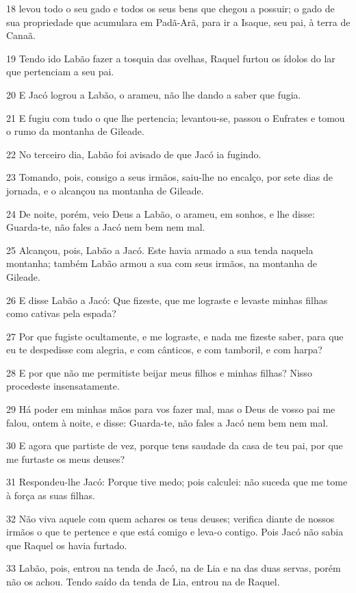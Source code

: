 \par 18 levou todo o seu gado e todos os seus bens que chegou a possuir; o gado de sua propriedade que acumulara em Padã-Arã, para ir a Isaque, seu pai, à terra de Canaã.
\par 19 Tendo ido Labão fazer a tosquia das ovelhas, Raquel furtou os ídolos do lar que pertenciam a seu pai.
\par 20 E Jacó logrou a Labão, o arameu, não lhe dando a saber que fugia.
\par 21 E fugiu com tudo o que lhe pertencia; levantou-se, passou o Eufrates e tomou o rumo da montanha de Gileade.
\par 22 No terceiro dia, Labão foi avisado de que Jacó ia fugindo.
\par 23 Tomando, pois, consigo a seus irmãos, saiu-lhe no encalço, por sete dias de jornada, e o alcançou na montanha de Gileade.
\par 24 De noite, porém, veio Deus a Labão, o arameu, em sonhos, e lhe disse: Guarda-te, não fales a Jacó nem bem nem mal.
\par 25 Alcançou, pois, Labão a Jacó. Este havia armado a sua tenda naquela montanha; também Labão armou a sua com seus irmãos, na montanha de Gileade.
\par 26 E disse Labão a Jacó: Que fizeste, que me lograste e levaste minhas filhas como cativas pela espada?
\par 27 Por que fugiste ocultamente, e me lograste, e nada me fizeste saber, para que eu te despedisse com alegria, e com cânticos, e com tamboril, e com harpa?
\par 28 E por que não me permitiste beijar meus filhos e minhas filhas? Nisso procedeste insensatamente.
\par 29 Há poder em minhas mãos para vos fazer mal, mas o Deus de vosso pai me falou, ontem à noite, e disse: Guarda-te, não fales a Jacó nem bem nem mal.
\par 30 E agora que partiste de vez, porque tens saudade da casa de teu pai, por que me furtaste os meus deuses?
\par 31 Respondeu-lhe Jacó: Porque tive medo; pois calculei: não suceda que me tome à força as suas filhas.
\par 32 Não viva aquele com quem achares os teus deuses; verifica diante de nossos irmãos o que te pertence e que está comigo e leva-o contigo. Pois Jacó não sabia que Raquel os havia furtado.
\par 33 Labão, pois, entrou na tenda de Jacó, na de Lia e na das duas servas, porém não os achou. Tendo saído da tenda de Lia, entrou na de Raquel.
